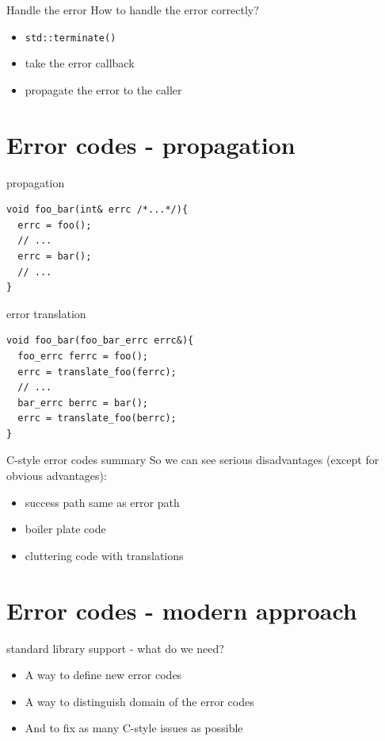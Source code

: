 \documentclass[10pt]{beamer}
\begin{document}
\begin{frame}{Handle the error}
	How to handle the error correctly?
	
	\pause
	
	\begin{itemize}[<+- | alert@+>]
		\item \texttt{std::terminate()}
		\item take the error callback
		\item propagate the error to the caller
	\end{itemize}
	
\end{frame}

\section{Error codes - propagation}

\begin{frame}[fragile]{propagation}
	\begin{verbatim}
void foo_bar(int& errc /*...*/){
  errc = foo();
  // ...
  errc = bar();		
  // ...
}
	\end{verbatim}
\end{frame}

\begin{frame}[fragile]{error translation}
	\begin{verbatim}
void foo_bar(foo_bar_errc errc&){
  foo_errc ferrc = foo();
  errc = translate_foo(ferrc);
  // ...
  bar_errc berrc = bar();
  errc = translate_foo(berrc);
}
	\end{verbatim}
\end{frame}

\begin{frame}{C-style error codes summary}
	So we can see {\color{red}serious disadvantages} (except for {\color{blue}obvious advantages}):
	
	\begin{itemize}[<+- | alert@+>]
		\item success path same as error path
		\item boiler plate code
		\item cluttering code with translations
	\end{itemize}
\end{frame}

\section{Error codes - modern approach}
\begin{frame}{standard library support - what do we need?}
	\begin{itemize}
		\item A way to define new error codes
		\item A way to distinguish domain of the error codes
		\item And to fix as many C-style issues as possible
	\end{itemize}
\end{frame}
\end{document}
